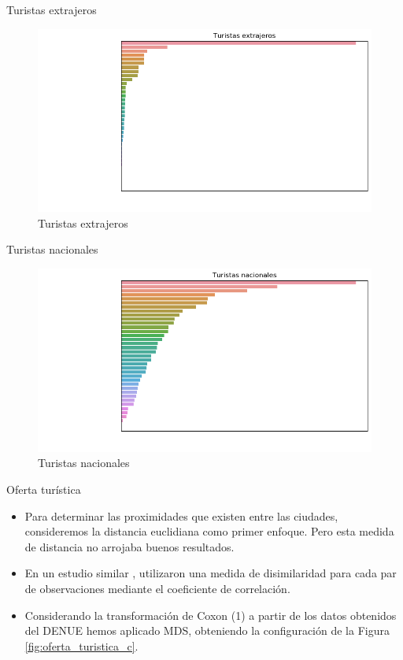 \begin{frame}{Turistas extrajeros}
\begin{figure}
    \centering
    \includegraphics[scale=0.5]{figure/turistas_extranjeros.png}
    \caption{Turistas extrajeros}
    \label{fig:turistas_extranjeros}
\end{figure}
\end{frame}

\begin{frame}{Turistas nacionales}
\begin{figure}
    \centering
    \includegraphics[scale=0.5]{figure/turistas_nacionales.png}
    \caption{Turistas nacionales}
    \label{fig:turistas_nacionales}
\end{figure}
\end{frame}




\begin{frame}{Oferta turística}
    \begin{itemize}[<+- | alert@+>]
\item Para determinar las proximidades que existen entre las ciudades, consideremos la distancia euclidiana como primer enfoque. Pero esta medida de distancia no arrojaba buenos resultados. 

\item En un estudio similar \cite{mds_tur}, utilizaron una medida de disimilaridad para cada par de observaciones mediante el coeficiente de correlación. 

\item Considerando la transformación de Coxon (1) a partir de los datos obtenidos del DENUE hemos aplicado MDS, obteniendo la configuración de la Figura \ref{fig:oferta_turistica_c}.
	\end{itemize}
\end{frame}

